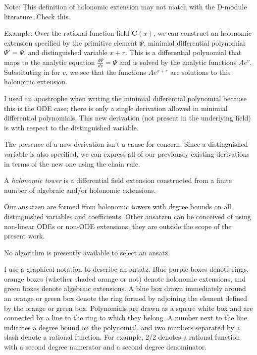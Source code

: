 \documentclass{article}
\begin{document}
Note: This definition of holonomic extension may not match with the D-module literature.  Check this.

Example: Over the rational function field $\mathbf{C}(x)$, we can construct an holonomic
extension specified by the primitive element $\Psi$, minimial differential polynomial
$\Psi' = \Psi$, and distinguished variable $x+r$.  This is a differential polynomial
that maps to the analytic equation $\frac{d\Psi}{dv}=\Psi$ and is solved
by the analytic functions $Ae^v$.  Substituting in for $v$, we see that
the functions $Ae^{x+r}$ are solutions to this holonomic extension.

I used an apostrophe when writing
the minimial differential polynomial because this is the ODE case; there is only
a single derivation allowed in minimial differential polynomials.  This new derivation
(not present in the underlying field) is with respect to the distinguished variable.

The presence of a new derivation isn't a cause for concern.  Since a distinguished
variable is also specified, we can express all of our previously existing derivations
in terms of the new one using the chain rule.

A {\it holonomic tower} is a differential field extension
constructed from a finite number of algebraic and/or holonomic
extensions.

Our ansatzen are formed from holonomic towers with degree bounds on all
distinguished variables and coefficients.  Other ansatzen can be
conceived of using non-linear ODEs or non-ODE extensions; they
are outside the scope of the present work.

No algorithm is presently available to select an ansatz.

I use a graphical notation to describe an ansatz.  Blue-purple boxes
denote rings, orange boxes (whether shaded orange or not) denote holonomic extensions, and green boxes denote
algebraic extensions.  A blue box drawn immediately around an orange or green box
denote the ring formed by adjoining the element defined by the orange or green box.
Polynomials are drawn as a square white box and are
connected by a line to the ring to which they belong.  A number next to
the line indicates a degree bound on the polynomial, and two numbers
separated by a slash denote a rational function.  For example, 2/2 denotes
a rational function with a second degree numerator and a second degree
denominator.
\end{document}
